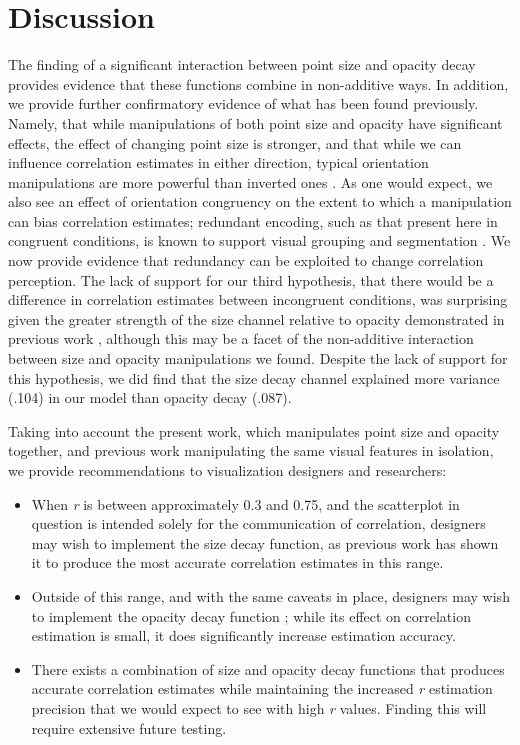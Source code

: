\documentclass[sigconf]{acmart}
\providecommand{\tightlist}{%
  \setlength{\itemsep}{0pt}\setlength{\parskip}{0pt}}\usepackage{longtable,booktabs,array}
\begin{document}
\hypertarget{sec-discussion}{%
\section{Discussion}\label{sec-discussion}}

The finding of a significant interaction between point size and opacity
decay provides evidence that these functions combine in non-additive
ways. In addition, we provide further confirmatory evidence of what has
been found previously. Namely, that while manipulations of both point
size and opacity have significant effects, the effect of changing point
size is stronger, and that while we can influence correlation estimates
in either direction, typical orientation manipulations are more powerful
than inverted ones \citep{strain_2023, strain_2023b}. As one would
expect, we also see an effect of orientation congruency on the extent to
which a manipulation can bias correlation estimates; redundant encoding,
such as that present here in congruent conditions, is known to support
visual grouping and segmentation \citep{nothelfer_2017}. We now provide
evidence that redundancy can be exploited to change correlation
perception. The lack of support for our third hypothesis, that there
would be a difference in correlation estimates between incongruent
conditions, was surprising given the greater strength of the size
channel relative to opacity demonstrated in previous work
\citep{strain_2023, strain_2023b, hong_2021}, although this may be a
facet of the non-additive interaction between size and opacity
manipulations we found. Despite the lack of support for this hypothesis,
we did find that the size decay channel explained more variance (.104)
in our model than opacity decay (.087).

Taking into account the present work, which manipulates point size and
opacity together, and previous work manipulating the same visual
features in isolation, we provide recommendations to visualization
designers and researchers:

\begin{itemize}
\tightlist
\item
  When \emph{r} is between approximately 0.3 and 0.75, and the
  scatterplot in question is intended solely for the communication of
  correlation, designers may wish to implement the size decay function,
  as previous work \citep{strain_2023b} has shown it to produce the most
  accurate correlation estimates in this range.
\item
  Outside of this range, and with the same caveats in place, designers
  may wish to implement the opacity decay function \citep{strain_2023};
  while its effect on correlation estimation is small, it does
  significantly increase estimation accuracy.
\item
  There exists a combination of size and opacity decay functions that
  produces accurate correlation estimates while maintaining the
  increased \emph{r} estimation precision that we would expect to see
  with high \emph{r} values. Finding this will require extensive future
  testing.
\end{itemize}
\end{document}
